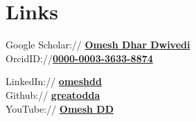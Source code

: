 \documentclass[]{deedy-resume-openfont}
\begin{document}
\begin{minipage}[t]{0.44\textwidth}

\section{Links} 
Google Scholar:// \href{https://scholar.google.com/citations?view_op=list_works&hl=en&user=2SBJFIgAAAAJ}{\bf Omesh Dhar Dwivedi} \\
OrcidID://\href{https://orcid.org/0000-0003-3633-8874}{\bf 0000-0003-3633-8874
}

LinkedIn://  \href{https://www.linkedin.com/in/omeshdd}{\bf omeshdd} \\
Github:// \href{https://github.com/greatodda}{\bf greatodda} \\
YouTube://  \href{https://www.youtube.com/channel/UCcQ8yuaJROwJW_gKEfD8SyQ}{\bf Omesh DD} \\





\end{minipage}
\end{document}
